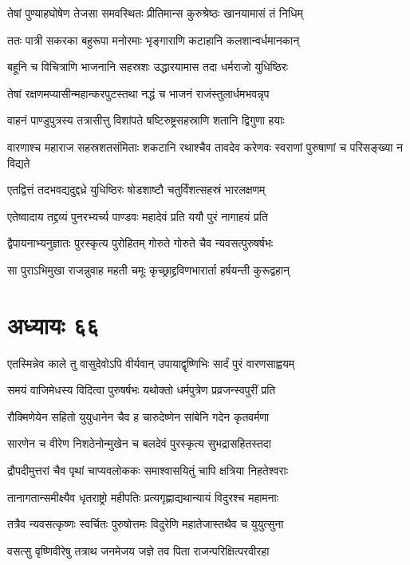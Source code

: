 \twolineshloka
{तेषां पुण्याहघोषेण तेजसा समवस्थितः}
{प्रीतिमान्स कुरुश्रेष्ठः खानयामासं तं निधिम्}


\twolineshloka
{ततः पात्री सकरका बहुरूपा मनोरमाः}
{भृङ्गाराणि कटाहानि कलशान्वर्धमानकान्}


\twolineshloka
{बहूनि च विचित्राणि भाजनानि सहस्रशः}
{उद्धारयामास तदा धर्मराजो युधिष्ठिरः}


\twolineshloka
{तेषां रक्षणमप्यासीन्महान्करपुटस्तथा}
{नद्धं च भाजनं राजंस्तुलार्धमभवन्नृप}


\twolineshloka
{वाहनं पाण्डुपुत्रस्य तत्रासीत्तु विशांपते}
{षष्टिरुष्ट्रसहस्राणि शतानि द्विगुणा हयाः}


\threelineshloka
{वारणाश्च महाराज सहस्रशतसंमिताः}
{शकटानि रथाश्चैव तावदेव करेणवः}
{स्वराणां पुरुषाणां च परिसङ्ख्या न विद्यते}


\twolineshloka
{एतद्वित्तं तदभवद्यदुद्दध्रे युधिष्ठिरः}
{षोडशाष्टौ चतुर्विंशत्सहस्रं भारलक्षणम्}


\twolineshloka
{एतेष्वादाय तद्द्रव्यं पुनरभ्यर्च्य पाण्डवः}
{महादेवं प्रति ययौ पुरं नागाहयं प्रति}


\twolineshloka
{द्वैपायनाभ्यनुज्ञातः पुरस्कृत्य पुरोहितम्}
{गोरुते गोरुते चैव न्यवसत्पुरुषर्षभः}


\twolineshloka
{सा पुराऽभिमुखा राजन्नुवाह महती चमूः}
{कृच्छ्राद्द्रविणभारार्ता हर्षयन्ती कुरूद्वहान्}


\chapter{अध्यायः ६६}
\twolineshloka
{एतस्मिन्नेव काले तु वासुदेवोऽपि वीर्यवान्}
{उपायाद्वृष्णिभिः सार्दं पुरं वारणसाह्वयम्}


\twolineshloka
{समयं वाजिमेधस्य विदित्वा पुरुषर्षभः}
{यथोक्तो धर्मपुत्रेण प्रव्रजन्स्वपुरीं प्रति}


\twolineshloka
{रौक्मिणेयेन सहितो युयुधानेन चैव ह}
{चारुदेष्णेन सांबेनि गदेन कृतवर्मणा}


\twolineshloka
{सारणेन च वीरेण निशठेनोन्मुखेन च}
{बलदेवं पुरस्कृत्य सुभद्रासहितस्तदा}


\twolineshloka
{द्रौपदीमुत्तरां चैव पृथां चाप्यवलोककः}
{समाश्वासयितुं चापि क्षत्रिया निहतेश्वराः}


\twolineshloka
{तानागतान्समीक्ष्यैव धृतराष्ट्रो महीपतिः}
{प्रत्यगृह्णाद्यथान्यायं विदुरश्च महामनाः}


\twolineshloka
{तत्रैव न्यवसत्कृष्णः स्वर्चितः पुरुषोत्तमः}
{विदुरेणि महातेजास्तथैव च युयुत्सुना}


\twolineshloka
{वसत्सु वृष्णिवीरेषु तत्राथ जनमेजय}
{जज्ञे तव पिता राजन्परिक्षित्परवीरहा}


